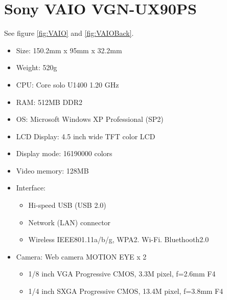 \chapter{Sony VAIO VGN-UX90PS}
\label{AppendixA}

See figure \ref{fig:VAIO} and \ref{fig:VAIOBack}.

\begin{itemize}
	\item Size: 150.2mm x 95mm x 32.2mm
	\item Weight: 520g
	\item CPU: Core solo U1400 1.20 GHz
	\item RAM: 512MB DDR2
	\item OS: Microsoft Windows XP Professional (SP2)
	\item LCD Display: 4.5 inch wide TFT color LCD
	\item Display mode: 16190000 colors
	\item Video memory: 128MB
	\item Interface:
		\begin{itemize}
			\item Hi-speed USB (USB 2.0)
			\item Network (LAN) connector
			\item Wireless IEEE801.11a/b/g, WPA2. Wi-Fi. Bluethooth2.0
		\end{itemize}
	\item Camera: Web camera MOTION EYE x 2
		\begin{itemize}
			\item 1/8 inch VGA Progressive CMOS, 3.3M pixel, f=2.6mm F4
			\item 1/4 inch SXGA Progressive CMOS, 13.4M pixel, f=3.8mm F4
		\end{itemize}
\end{itemize}
